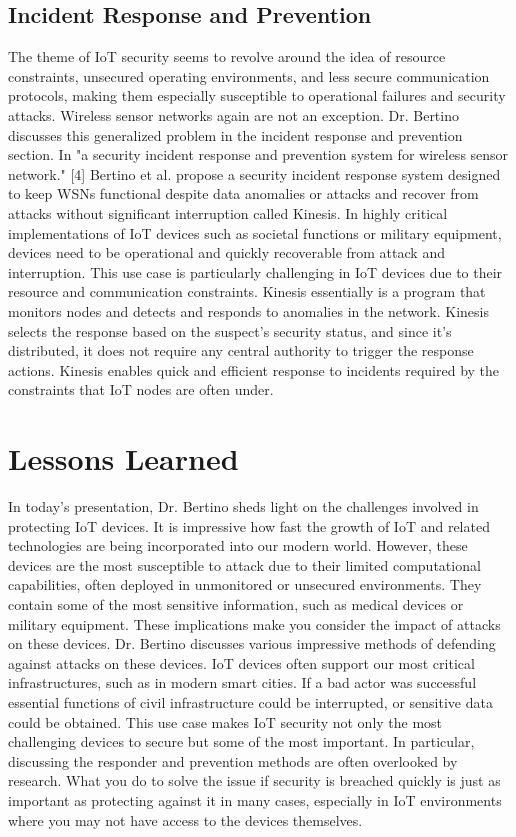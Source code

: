 \documentclass[journal,onecolumn]{IEEEtran}
\begin{document}
\subsection{Incident Response and Prevention}

The theme of IoT security seems to revolve around the idea of resource constraints, unsecured operating environments, and less secure communication protocols, making them especially susceptible to operational failures and security attacks. Wireless sensor networks again are not an exception. Dr. Bertino discusses this generalized problem in the incident response and prevention section. In "a security incident response and prevention system for wireless sensor network." [4] Bertino et al. propose a security incident response system designed to keep WSNs functional despite data anomalies or attacks and recover from attacks without significant interruption called Kinesis. In highly critical implementations of IoT devices such as societal functions or military equipment, devices need to be operational and quickly recoverable from attack and interruption. This use case is particularly challenging in IoT devices due to their resource and communication constraints. Kinesis essentially is a program that monitors nodes and detects and responds to anomalies in the network. Kinesis selects the response based on the suspect's security status, and since it's distributed, it does not require any central authority to trigger the response actions. Kinesis enables quick and efficient response to incidents required by the constraints that IoT nodes are often under. 

\section{Lessons Learned}

In today's presentation, Dr. Bertino sheds light on the challenges involved in protecting IoT devices. It is impressive how fast the growth of IoT and related technologies are being incorporated into our modern world. However, these devices are the most susceptible to attack due to their limited computational capabilities, often deployed in unmonitored or unsecured environments. They contain some of the most sensitive information, such as medical devices or military equipment. These implications make you consider the impact of attacks on these devices. Dr. Bertino discusses various impressive methods of defending against attacks on these devices.  IoT devices often support our most critical infrastructures, such as in modern smart cities. If a bad actor was successful essential functions of civil infrastructure could be interrupted, or sensitive data could be obtained. This use case makes IoT security not only the most challenging devices to secure but some of the most important. In particular, discussing the responder and prevention methods are often overlooked by research. What you do to solve the issue if security is breached quickly is just as important as protecting against it in many cases, especially in IoT environments where you may not have access to the devices themselves. 
\end{document}

